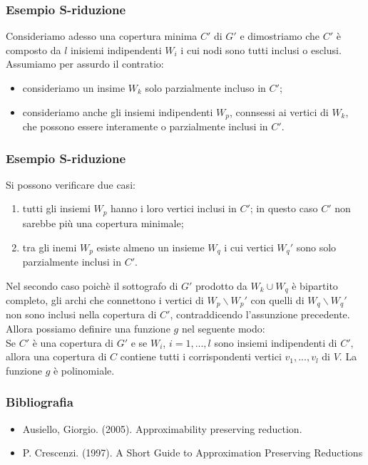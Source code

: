\documentclass{beamer}
\begin{document}
\begin{frame}
    \frametitle{Esempio S-riduzione}
    Consideriamo adesso una copertura minima $C'$ di $G'$ e dimostriamo che $C'$ è composto da $l$ inisiemi indipendenti $W_i$ i cui nodi sono tutti inclusi o esclusi.\\
    Assumiamo per assurdo il contratio:
    \begin{itemize}
     \item consideriamo un insime $W_k$ solo parzialmente incluso in $C'$;
     \item consideriamo anche gli insiemi indipendenti $W_p$, connsessi ai vertici di $W_k$, che possono essere interamente o parzialmente inclusi in $C'$.
    \end{itemize}
\end{frame}

\begin{frame}
    \frametitle{Esempio S-riduzione}
    Si possono verificare due casi:
    \begin{enumerate}
     \item tutti gli insiemi $W_p$ hanno i loro vertici inclusi in $C'$; in questo caso $C'$ non sarebbe più una copertura minimale;
     \item tra gli inemi $W_p$ esiste almeno un insieme $W_q$ i cui vertici $W_q'$ sono solo parzialmente inclusi in $C'$.
    \end{enumerate}
    Nel secondo caso poichè il sottografo di $G'$ prodotto da $W_k \cup W_q$ è bipartito completo, gli archi che connettono i vertici di $W_p \backslash W_p' $ con quelli di $W_q\backslash W_q'$ non sono inclusi nella copertura di $C'$, contraddicendo l'assunzione precedente.\\
    Allora possiamo definire una funzione $g$ nel seguente modo:\\
    Se $C'$ è una copertura di $G'$ e se $W_i$, $i=1,...,l$ sono insiemi indipendenti di $C'$, allora una copertura di $C$ contiene tutti i corrispondenti vertici $v_1,..., v_l$ di $V$. La funzione $g$ è polinomiale.
    
\end{frame}



\begin{frame}
    \frametitle{Bibliografia}
    \begin{itemize}
     \item Ausiello, Giorgio. (2005). Approximability preserving reduction. 
     \item P. Crescenzi. (1997). A Short Guide to Approximation Preserving Reductions
    \end{itemize}


\end{frame}
\end{document}
